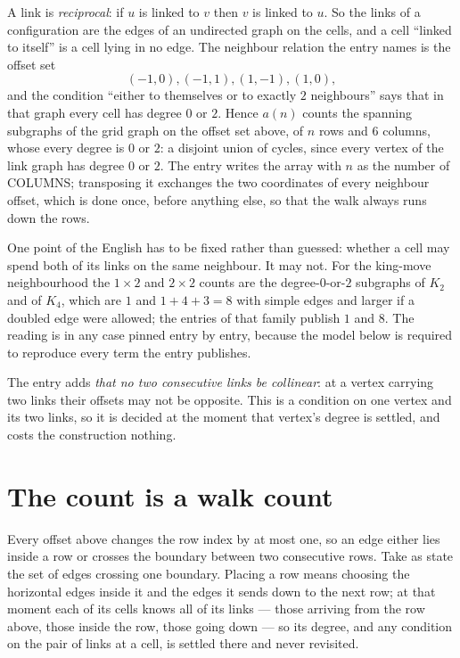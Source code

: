 \documentclass[11pt,a4paper]{article}
\theoremstyle{plain}
\theoremstyle{definition}
\begin{document}
A link is \emph{reciprocal}: if $u$ is linked to $v$ then $v$ is linked to $u$. So the links
of a configuration are the edges of an undirected graph on the cells, and a cell ``linked to
itself'' is a cell lying in no edge. The neighbour relation the entry names is the offset set
\[
(-1,0), (-1,1), (1,-1), (1,0),
\]
and the condition ``either to themselves or to exactly $2$ neighbours'' says that in that
graph every cell has degree $0$ or $2$. Hence $a(n)$ counts the spanning subgraphs of the
grid graph on the offset set above, of $n$ rows and $6$ columns,
whose every degree is $0$ or $2$: a disjoint union of cycles, since every vertex of the link graph has degree $0$ or $2$. The entry writes the array with $n$ as the number of COLUMNS; transposing it exchanges the two coordinates of every neighbour offset, which is done once, before anything else, so that the walk always runs down the rows.

One point of the English has to be fixed rather than guessed: whether a cell may spend both of
its links on the same neighbour. It may not. For the king-move neighbourhood the $1\times2$
and $2\times2$ counts are the degree-$0$-or-$2$ subgraphs of $K_2$ and of $K_4$, which are $1$
and $1+4+3=8$ with simple edges and larger if a doubled edge were allowed; the entries of that
family publish $1$ and $8$. The reading is in any case pinned entry by entry, because the
model below is required to reproduce every term the entry publishes.

The entry adds \emph{that no two consecutive links be collinear}: at a vertex carrying two
links their offsets may not be opposite. This is a condition on one vertex and its two links,
so it is decided at the moment that vertex's degree is settled, and costs the construction
nothing.

\section{The count is a walk count}

Every offset above changes the row index by at most one, so an edge either lies inside a row
or crosses the boundary between two consecutive rows. Take as state the set of edges crossing
one boundary. Placing a row means choosing the horizontal edges inside it and the edges it
sends down to the next row; at that moment each of its cells knows all of its links --- those
arriving from the row above, those inside the row, those going down --- so its degree, and any
condition on the pair of links at a cell, is settled there and never revisited.
\end{document}
